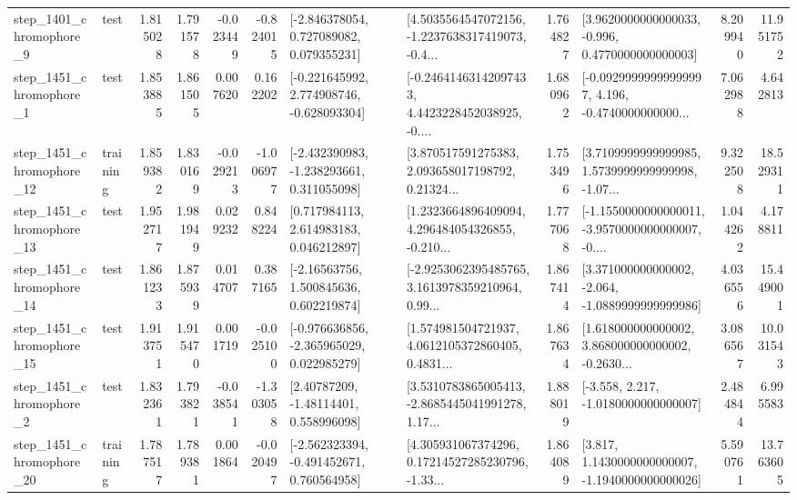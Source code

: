 \begin{tabular}{llrrrrllrlrr}
  step\_1401\_chromophore\_9 &      test &      1.815028 &    1.791578 &     -0.023449 & -0.824015 &    [-2.846378054, 0.727089082, 0.079355231] &  [4.5035564547072156, -1.2237638317419073, -0.4... &       1.764827 &   [3.9620000000000033, -0.996, 0.4770000000000003] &            8.209940 &         11.951752 \\
  step\_1451\_chromophore\_1 &      test &      1.853885 &    1.861505 &      0.007620 &  0.162202 &   [-0.221645992, 2.774908746, -0.628093304] &  [-0.24641463142097433, 4.4423228452038925, -0.... &       1.680962 &  [-0.09299999999999997, 4.196, -0.4740000000000... &            7.062988 &          4.642813 \\
 step\_1451\_chromophore\_12 &  training &      1.859382 &    1.830169 &     -0.029213 & -1.006977 &   [-2.432390983, -1.238293661, 0.311055098] &  [3.870517591275383, 2.093658017198792, 0.21324... &       1.753496 &  [3.7109999999999985, 1.5739999999999998, -1.07... &            9.322508 &         18.529311 \\
 step\_1451\_chromophore\_13 &      test &      1.952717 &    1.981949 &      0.029232 &  0.848224 &     [0.717984113, 2.614983183, 0.046212897] &  [1.2323664896409094, 4.296484054326855, -0.210... &       1.777068 &  [-1.1550000000000011, -3.9570000000000007, -0.... &            1.044262 &          4.178811 \\
 step\_1451\_chromophore\_14 &      test &      1.861233 &    1.875939 &      0.014707 &  0.387165 &     [-2.16563756, 1.500845636, 0.602219874] &  [-2.9253062395485765, 3.1613978359210964, 0.99... &       1.867414 &   [3.371000000000002, -2.064, -1.0889999999999986] &            4.036556 &         15.449001 \\
 step\_1451\_chromophore\_15 &      test &      1.913751 &    1.915470 &      0.001719 & -0.025100 &   [-0.976636856, -2.365965029, 0.022985279] &  [1.574981504721937, 4.0612105372860405, 0.4831... &       1.867634 &  [1.618000000000002, 3.868000000000002, -0.2630... &            3.086567 &         10.031543 \\
  step\_1451\_chromophore\_2 &      test &      1.832361 &    1.793821 &     -0.038541 & -1.303058 &      [2.40787209, -1.48114401, 0.558996098] &  [3.5310783865005413, -2.8685445041991278, 1.17... &       1.888019 &               [-3.558, 2.217, -1.0180000000000007] &            2.484844 &          6.995583 \\
 step\_1451\_chromophore\_20 &  training &      1.787517 &    1.789381 &      0.001864 & -0.020497 &   [-2.562323394, -0.491452671, 0.760564958] &  [4.305931067374296, 0.17214527285230796, -1.33... &       1.864089 &   [3.817, 1.1430000000000007, -1.1940000000000026] &            5.590761 &         13.763605 \\

\end{tabular}

